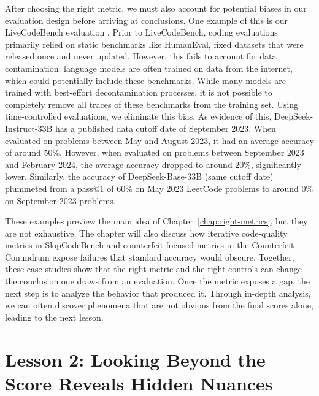 After choosing the right metric, we must also account for potential biases in our evaluation design before arriving at conclusions.
One example of this is our LiveCodeBench evaluation \citep{jain2024livecodebenchholisticcontaminationfree}.
Prior to LiveCodeBench, coding evaluations primarily relied on static benchmarks like HumanEval, fixed datasets that were released once and 
never updated. However, this fails to account for data contamination: language models are often trained on data from the internet, which 
could potentially include these benchmarks. While many models are trained with best-effort decontamination processes, it is not possible to 
completely remove all traces of these benchmarks from the training set. Using time-controlled evaluations, we eliminate this bias. 
As evidence of this, DeepSeek-Instruct-33B \citep{guo2024deepseek} has a published data cutoff date of September 2023. When evaluated on problems between May and August 2023, it had an average 
accuracy of around 50\%. However, when evaluated on problems between September 2023 and February 2024, the average accuracy dropped to around 20\%, significantly lower.
Similarly, the accuracy of DeepSeek-Base-33B (same cutoff date) plummeted from a pass@1 of 60\% on May 2023 LeetCode problems to around 0\% on September 2023 problems.

These examples preview the main idea of Chapter~\ref{chap:right-metrics}, but they are not exhaustive.
The chapter will also discuss how iterative code-quality metrics in SlopCodeBench \citep{orlanski2026slopcodebench} and counterfeit-focused
metrics in the Counterfeit Conundrum \citep{gu2024counterfeit} expose failures that standard accuracy would obscure. Together, these
case studies show that the right metric and the right controls can change the conclusion one draws from an evaluation.
Once the metric exposes a gap, the next step is to analyze the behavior that produced it.
Through in-depth analysis, we can often discover phenomena that are not obvious from the final
scores alone, leading to the next lesson.

\section{Lesson 2: Looking Beyond the Score Reveals Hidden Nuances}

